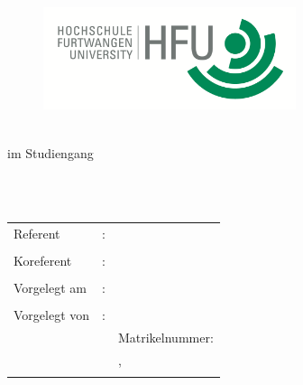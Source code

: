 \begin{titlepage}
\pagestyle{empty}

\begin{flushright}
\begin{figure}[ht]
\flushright
\includegraphics[height=3cm]{images/LogoHFU}
\end{figure}
\end{flushright}

\begin{center}
{\fontsize{18}{22} \selectfont \docArtDerArbeit}\\[5mm]
{\fontsize{18}{22} \selectfont im Studiengang} \\[5mm]
{\fontsize{18}{22} \selectfont \docStudiengang}\\
\vspace{1cm}
\begin{onehalfspace}
{\fontsize{22}{26} \selectfont \textbf{\docTitle}}\\[5mm]
{\fontsize{18}{22} \selectfont \docUntertitle}


\end{onehalfspace}
\end{center}

\vfill
\begin{center}
\begin{tabular}{lcl}
Referent  		&:& \docErsterReferent 	\\ \\
Koreferent 		&:& \docZweiterReferent \\ \\	
Vorgelegt am 	&:& \docAbgabedatum 	\\ \\
Vorgelegt von 	&:& \docVorname~\docNachname\\
				& & Matrikelnummer: \docMatrikelnummer\\
				& & \docStrasse,~\docPlz~\docOrt	\\
				& & \docEmail			
\end{tabular}
\end{center}
\end{titlepage}
